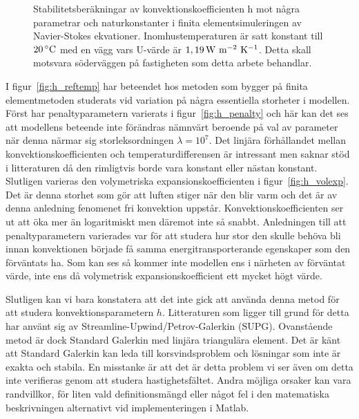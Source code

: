 \begin{figure}[hpbt]
\caption{\label{fig:konv_param}Stabilitets\-beräkningar av konvektions\-koefficienten h mot några
parametrar och natur\-konstanter i finita element\-simuleringen av Navier-Stokes ekvationer.
Inomhus\-temperaturen är satt konstant till $\unit[20]{^\circ C}$ med en vägg vars U-värde är
$\unit[1,19]{ W~m^{-2}~K^{-1}}$. Detta skall motsvara söder\-väggen på fastigheten som detta arbete behandlar.}

\end{figure}

I figur~\ref{fig:h_reftemp} har beteendet hos metoden som bygger på finita elementmetoden studerats vid variation på några essentiella storheter i modellen.
Först har penaltyparametern varierats i figur~\ref{fig:h_penalty} och här kan det ses att modellens beteende inte förändras nämnvärt
beroende på val av parameter när denna närmar sig storleksordningen $\lambda = 10^7$. Det linjära förhållandet mellan
konvektionskoefficienten och temperaturdifferensen är intressant men saknar stöd i litteraturen då den rimligtvis borde vara
konstant eller nästan konstant. Slutligen varieras den volymetriska expansionskoefficienten
i figur~\ref{fig:h_volexp}. Det är denna storhet
som gör att luften stiger när den blir varm och det är av denna anledning fenomenet fri konvektion uppstår. Konvektionskoefficienten
ser ut att öka mer än logaritmiskt men däremot inte så snabbt. Anledningen till att penaltyparametern varierades var för
att studera hur stor den skulle behöva bli innan konvektionen började få samma energitransporterande egenskaper
som den förväntats ha. Som kan ses så kommer inte modellen ens i närheten av förväntat värde, inte ens då volymetrisk expansionskoefficient ett mycket högt värde.

Slutligen kan vi bara konstatera att det inte gick att använda denna metod för att studera konvektionsparametern $h$. Litteraturen
som ligger till grund för detta har använt sig av Streamline-Upwind/Petrov-Galerkin (SUPG)\cite{heinrich88}\cite{roy05}. Ovanstående metod är dock
Standard Galerkin med linjära triangulära element. Det är känt att Standard Galerkin kan leda till korsvindsproblem och lösningar som inte är
exakta och stabila\cite{segal2011}.
En misstanke är att det är detta problem vi ser även om detta inte verifieras genom att studera hastighetsfältet. Andra
möjliga orsaker kan vara randvillkor, för liten vald definitionsmängd eller något fel i den matematiska beskrivningen alternativt
vid implementeringen i Matlab.
